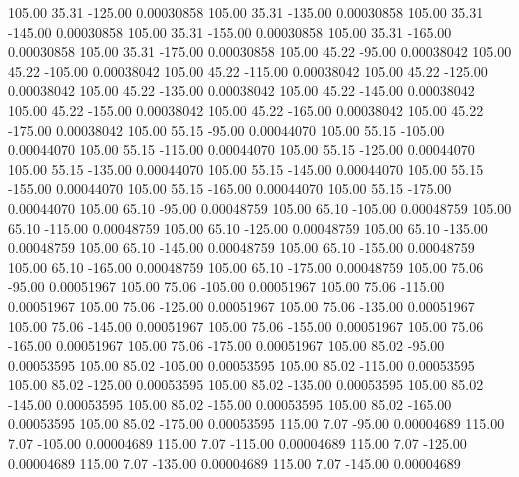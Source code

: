     105.00     35.31   -125.00     0.00030858
    105.00     35.31   -135.00     0.00030858
    105.00     35.31   -145.00     0.00030858
    105.00     35.31   -155.00     0.00030858
    105.00     35.31   -165.00     0.00030858
    105.00     35.31   -175.00     0.00030858
    105.00     45.22    -95.00     0.00038042
    105.00     45.22   -105.00     0.00038042
    105.00     45.22   -115.00     0.00038042
    105.00     45.22   -125.00     0.00038042
    105.00     45.22   -135.00     0.00038042
    105.00     45.22   -145.00     0.00038042
    105.00     45.22   -155.00     0.00038042
    105.00     45.22   -165.00     0.00038042
    105.00     45.22   -175.00     0.00038042
    105.00     55.15    -95.00     0.00044070
    105.00     55.15   -105.00     0.00044070
    105.00     55.15   -115.00     0.00044070
    105.00     55.15   -125.00     0.00044070
    105.00     55.15   -135.00     0.00044070
    105.00     55.15   -145.00     0.00044070
    105.00     55.15   -155.00     0.00044070
    105.00     55.15   -165.00     0.00044070
    105.00     55.15   -175.00     0.00044070
    105.00     65.10    -95.00     0.00048759
    105.00     65.10   -105.00     0.00048759
    105.00     65.10   -115.00     0.00048759
    105.00     65.10   -125.00     0.00048759
    105.00     65.10   -135.00     0.00048759
    105.00     65.10   -145.00     0.00048759
    105.00     65.10   -155.00     0.00048759
    105.00     65.10   -165.00     0.00048759
    105.00     65.10   -175.00     0.00048759
    105.00     75.06    -95.00     0.00051967
    105.00     75.06   -105.00     0.00051967
    105.00     75.06   -115.00     0.00051967
    105.00     75.06   -125.00     0.00051967
    105.00     75.06   -135.00     0.00051967
    105.00     75.06   -145.00     0.00051967
    105.00     75.06   -155.00     0.00051967
    105.00     75.06   -165.00     0.00051967
    105.00     75.06   -175.00     0.00051967
    105.00     85.02    -95.00     0.00053595
    105.00     85.02   -105.00     0.00053595
    105.00     85.02   -115.00     0.00053595
    105.00     85.02   -125.00     0.00053595
    105.00     85.02   -135.00     0.00053595
    105.00     85.02   -145.00     0.00053595
    105.00     85.02   -155.00     0.00053595
    105.00     85.02   -165.00     0.00053595
    105.00     85.02   -175.00     0.00053595
    115.00      7.07    -95.00     0.00004689
    115.00      7.07   -105.00     0.00004689
    115.00      7.07   -115.00     0.00004689
    115.00      7.07   -125.00     0.00004689
    115.00      7.07   -135.00     0.00004689
    115.00      7.07   -145.00     0.00004689
